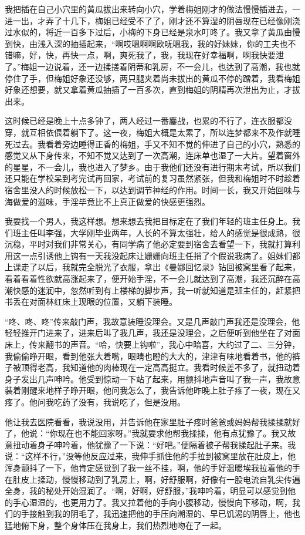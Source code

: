\documentclass[12pt,UTF8]{ctexbook}
\begin{document}
我把插在自己小穴里的黄瓜拔出来转向小穴，学着梅姐刚才的做法慢慢插进去，一进一出，才弄了十几下，梅姐已经受不了了，刚才还不算湿的阴唇现在已经像刚浇过水似的，将近一百多下过后，小梅的下身已经是泉水叮咚了。我又拿了黄瓜由慢到快，由浅入深的抽插起来，“啊哎嗯啊啊欧呒嗯我，我的好妹妹，你的工夫也不错嘛，好，快，再快一点，啊，爽死我了，我，我现在好幸福啊，啊我快要泄了。”梅姐一边说着，还一边揉搓着阴蒂和乳房，不一会儿，也达到了高潮，我也就停住了手，但梅姐好象还没够，两只腿夹着尚未拔出的黄瓜不停的蹭着，我看梅姐好象还想要，就又拿着黄瓜抽插了一百多次，直到梅姐的阴精再次泄出为止，才拔出来。

这时候已经是晚上十点多钟了，两人经过一番鏖战，也累的不行了，连衣服都没穿，就互相依偎着躺下了。这一夜，梅姐大概是太累了，所以连梦都来不及作就睡死过去。我看着旁边睡得正香的梅姐，手又不知不觉的伸进了自己的小穴，熟悉的感觉又从下身传来，不知不觉又达到了一次高潮，连床单也湿了一大片。望着窗外的星星，不一会儿，我也进入了梦乡。由于我他们还没有进行期末考试，所以我们还只能在学校呆到考完试再回家，考试前的复习虽然紧张，但我和梅姐时不时趁着宿舍里没人的时候放松一下，以达到调节神经的作用。时间一长，我又开始回味与海做爱的滋味，手淫毕竟比不上真正做爱的快感更强烈。

我要找一个男人，我这样想。想来想去我把目标定在了我们年轻的班主任身上。我们班主任叫李强，大学刚毕业两年，人长的不算太强壮，给人的感觉是很成熟，很沉稳，平时对我们非常关心，有同学病了他必定要到宿舍去看望一下，我就打算利用这一点引诱他上钩有一天我没起床让姗姗向班主任捎了个假说我病了。姐妹们都上课走了以后，我就完全脱光了衣服，拿出《曼娜回忆录》钻回被窝里看了起来，看着看着性欲就高涨起来了，便开始手淫，不一会儿就达到了高潮，我还沉醉在高潮快感的迷润中，忽然听到有上楼梯的脚步声，我一听就知道是班主任的，赶紧把书丢在对面林红床上现眼的位置，又躺下装睡。

“咚、咚、咚”传来敲门声，我故意装睡没理会。又是几声敲门声我还是没理会，他轻轻推开门进来了，进来后叫了我几声，我还是没理会，之后便听到他坐在了对面床上，传来翻书的声音。“哈，快要上钩啦”，我心中暗喜，大约过了二、三分钟，我偷偷睁开眼，看到他张大着嘴，眼睛也瞪的大大的，津津有味地看着书，他的裤子被顶得老高，我知道他的肉棒现在一定高高挺立。我看时候差不多了，就扭动着身子发出几声呻吟。他受到惊动一下站了起来，用颤抖地声音叫了我一声，我故意装着刚醒来地样子睁开眼，他问我怎么了，我告诉他昨晚上肚子疼了一夜，现在又疼了。他问我吃药了没有，我说吃了，但是没用。

他让我去医院看看，我说没用，并告诉他在家里肚子疼时爸爸或妈妈帮我揉揉就好了，他说：“你现在也不能回家呀。”我就要求他帮我揉揉，他有点犹豫了。我又故意扭动着身子呻吟着，他犹豫了一下说：“好吧。”便隔着被子帮我揉起肚子来。我说：“这样不行，”没等他反应过来，我伸手抓住他的手拉到被窝里放在肚皮上，他浑身颤抖了一下，他肯定感觉到了我一丝不挂，啊，他的手好温暖埃我拉着他的手在肚皮上揉动，慢慢移动到了乳房上，啊，好舒服啊，好像有一股电流自乳尖传遍全身，我的秘处开始湿润了。“啊，好啊，好舒服，”我呻吟着，明显可以感觉到他的手心湿湿的，也更用力了。我又拉着他的手向小腹移动，慢慢向下移动，啊，我们的手接触到我的阴毛了，我迅速把他的手压向潮湿的、早已饥渴的阴唇上，他也猛地俯下身，整个身体压在我身上，我们热烈地吻在了一起。
\end{document}
